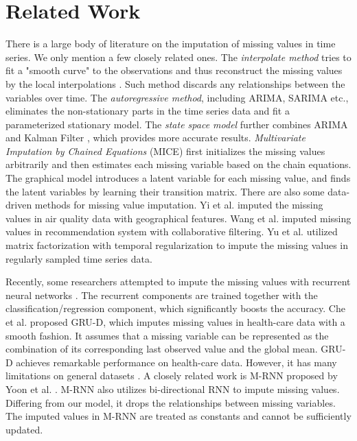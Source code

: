 \documentclass{article}
\begin{document}
 \section{Related Work}
\label{sec:related_work}
There is a large body of literature on the imputation of missing values in time series. We only mention a few closely related ones. The {\em interpolate method} tries to fit a "smooth curve" to the observations and thus reconstruct the missing values by the local interpolations \cite{kreindler2012effects,fung2006methods}.  Such method discards any relationships between the variables over time. The {\em autoregressive method}, including ARIMA, SARIMA etc., eliminates the non-stationary parts in the time series data and fit a parameterized stationary model. The {\em state space model} further combines  ARIMA  and  Kalman Filter \cite{fung2006methods,harvey1990forecasting}, which provides more accurate results. {\em  Multivariate Imputation by Chained Equations} (MICE) \cite{azur2011multiple} first initializes the missing values arbitrarily and then estimates each missing variable based on the chain equations. The graphical model \cite{li2009dynammo} introduces a latent variable for each missing value, and finds the latent variables by learning their transition matrix.
There are also some data-driven methods for missing value imputation. Yi et al. \cite{yi2016st} imputed the missing values in air quality data with geographical features. Wang et al. \cite{wang2006unifying} imputed  missing values in recommendation system with collaborative filtering. Yu et al. \cite{yu2016temporal} utilized matrix factorization with temporal regularization to impute the missing values in regularly sampled time series data.

Recently, some researchers attempted to impute the missing values with recurrent neural networks \cite{berglund2015bidirectional,che2018recurrent,lipton2016directly,choi2016doctor,yoon2017multi}. The recurrent components are trained together with the classification/regression component, which significantly boosts the accuracy.  Che et al. \cite{che2018recurrent} proposed GRU-D, which imputes missing values in health-care data with a smooth fashion. It assumes that a missing variable can be represented as the combination of its corresponding last observed value and the global mean. GRU-D achieves remarkable performance on health-care data. However, it has many limitations on general datasets \cite{che2018recurrent}. A closely related work is M-RNN proposed by Yoon et al. \cite{yoon2017multi}. M-RNN also utilizes bi-directional RNN to impute missing values. Differing from our model, it drops the relationships between missing variables. The imputed values in M-RNN are treated as constants and cannot be sufficiently updated.
\end{document}
